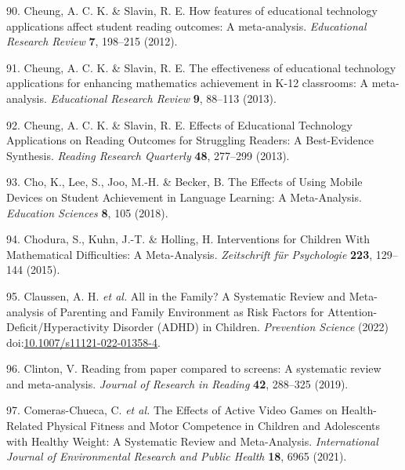 \documentclass[
  english,
  man]{apa6}
\newenvironment{cslreferences}%
  {}%
  {\par}
\begin{document}
\begin{cslreferences}
\leavevmode\hypertarget{ref-cheungHowFeaturesEducational2012}{}%
90. Cheung, A. C. K. \& Slavin, R. E. How features of educational technology applications affect student reading outcomes: A meta-analysis. \emph{Educational Research Review} \textbf{7}, 198--215 (2012).

\leavevmode\hypertarget{ref-cheungEffectivenessEducationalTechnology2013}{}%
91. Cheung, A. C. K. \& Slavin, R. E. The effectiveness of educational technology applications for enhancing mathematics achievement in K-12 classrooms: A meta-analysis. \emph{Educational Research Review} \textbf{9}, 88--113 (2013).

\leavevmode\hypertarget{ref-cheungEffectsEducationalTechnology2013}{}%
92. Cheung, A. C. K. \& Slavin, R. E. Effects of Educational Technology Applications on Reading Outcomes for Struggling Readers: A Best-Evidence Synthesis. \emph{Reading Research Quarterly} \textbf{48}, 277--299 (2013).

\leavevmode\hypertarget{ref-choEffectsUsingMobile2018}{}%
93. Cho, K., Lee, S., Joo, M.-H. \& Becker, B. The Effects of Using Mobile Devices on Student Achievement in Language Learning: A Meta-Analysis. \emph{Education Sciences} \textbf{8}, 105 (2018).

\leavevmode\hypertarget{ref-choduraInterventionsChildrenMathematical2015}{}%
94. Chodura, S., Kuhn, J.-T. \& Holling, H. Interventions for Children With Mathematical Difficulties: A Meta-Analysis. \emph{Zeitschrift für Psychologie} \textbf{223}, 129--144 (2015).

\leavevmode\hypertarget{ref-claussenAllFamilySystematic2022}{}%
95. Claussen, A. H. \emph{et al.} All in the Family? A Systematic Review and Meta-analysis of Parenting and Family Environment as Risk Factors for Attention-Deficit/Hyperactivity Disorder (ADHD) in Children. \emph{Prevention Science} (2022) doi:\href{https://doi.org/10.1007/s11121-022-01358-4}{10.1007/s11121-022-01358-4}.

\leavevmode\hypertarget{ref-clintonReadingPaperCompared2019}{}%
96. Clinton, V. Reading from paper compared to screens: A systematic review and meta-analysis. \emph{Journal of Research in Reading} \textbf{42}, 288--325 (2019).

\leavevmode\hypertarget{ref-comeras-chuecaEffectsActiveVideo2021}{}%
97. Comeras-Chueca, C. \emph{et al.} The Effects of Active Video Games on Health-Related Physical Fitness and Motor Competence in Children and Adolescents with Healthy Weight: A Systematic Review and Meta-Analysis. \emph{International Journal of Environmental Research and Public Health} \textbf{18}, 6965 (2021).


\end{cslreferences}
\end{document}
